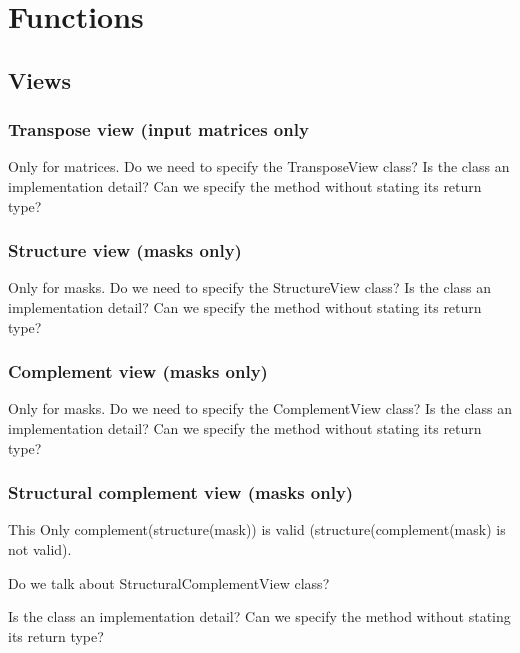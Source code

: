 \chapter{Functions}
\label{Chp:Functions}

\section{Views}

\subsection{Transpose view (input matrices only}

Only for matrices.  Do we need to specify the TransposeView class?
Is the class an implementation detail?  Can we specify the method without stating its return type?


\subsection{Structure view (masks only)}

Only for masks.  Do we need to specify the StructureView class?
Is the class an implementation detail?  Can we specify the method without stating its return type?


\subsection{Complement view (masks only)}

Only for masks.  Do we need to specify the ComplementView class?
Is the class an implementation detail?  Can we specify the method without stating its return type?


\subsection{Structural complement view (masks only)}

This Only complement(structure(mask)) is valid  (structure(complement(mask) is not valid).

Do we talk about StructuralComplementView class?

Is the class an implementation detail?  Can we specify the method without stating its return type?
